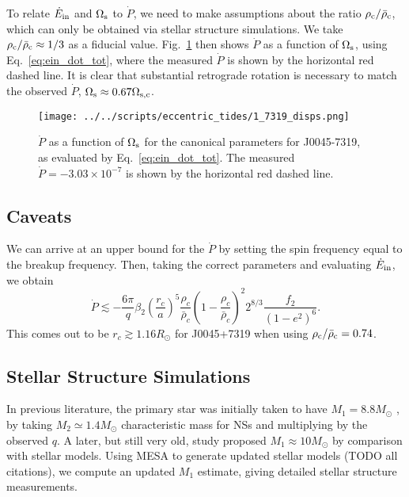 \documentclass[
        fleqn,
        usenatbib,
    ]{mnras}
\begin{document}
To relate $\dot{E}_{\rm in}$ and $\Omega_{\rm s}$ to $\dot{P}$, we need to make
assumptions about the ratio $\rho_{\rm c} / \bar{\rho}_{\rm c}$, which can only
be obtained via stellar structure simulations. We take $\rho_{\rm c} /
\bar{\rho}_{\rm c} \approx 1/3$ as a fiducial value. Fig.~\ref{fig:j0045_fid}
then shows $\dot{P}$ as a function of $\Omega_{\rm s}$, using
Eq.~\eqref{eq:ein_dot_tot}, where the measured $\dot{P}$ is shown by the
horizontal red dashed line. It is clear that substantial retrograde rotation is
necessary to match the observed $\dot{P}$, $\Omega_{\rm s} \approx 0.67
\Omega_{\rm s, c}$.
\begin{figure}
    \centering
    \texttt{[image: ../../scripts/eccentric\_tides/1\_7319\_disps.png]}
    \caption{$\dot{P}$ as a function of $\Omega_{\rm s}$ for the canonical
    parameters for J0045-7319, as evaluated by Eq.~\eqref{eq:ein_dot_tot}. The
    measured $\dot{P} = -3.03\times 10^{-7}$ is shown by the horizontal red
    dashed line. }\label{fig:j0045_fid}
\end{figure}

\subsection{Caveats}

We can arrive at an upper bound for the $\dot{P}$ by setting the spin frequency
equal to the breakup frequency. Then, taking the correct parameters and
evaluating $\dot{E}_{\rm in}$, we obtain
\begin{equation}
    \dot{P} \lesssim
        -\frac{6\pi}{q}\beta_2 \left(\frac{r_c}{a}\right)^5
        \frac{\rho_c}{\bar{\rho}_c} \left(1 -
        \frac{\rho_c}{\bar{\rho}_c}\right)^2 2^{8/3}\frac{f_2}{(1 - e^2)^6}.
\end{equation}
This comes out to be $r_c \gtrsim 1.16R_{\odot}$ for J0045+7319 when using
$\rho_{\rm c} / \bar{\rho}_{\rm c} = 0.74$.

\subsection{Stellar Structure Simulations}

In previous literature, the primary star was initially taken to have $M_1 =
8.8M_{\odot}$ \citep{kumar1998,lai1996}, by taking $M_2 \simeq 1.4M_{\odot}$
characteristic mass for NSs and multiplying by the observed $q$. A later, but
still very old, study proposed $M_1 \approx 10M_{\odot}$ by comparison with
stellar models. Using MESA to generate updated stellar models (TODO all
citations), we compute an updated $M_1$ estimate, giving detailed stellar
structure measurements.
\end{document}
